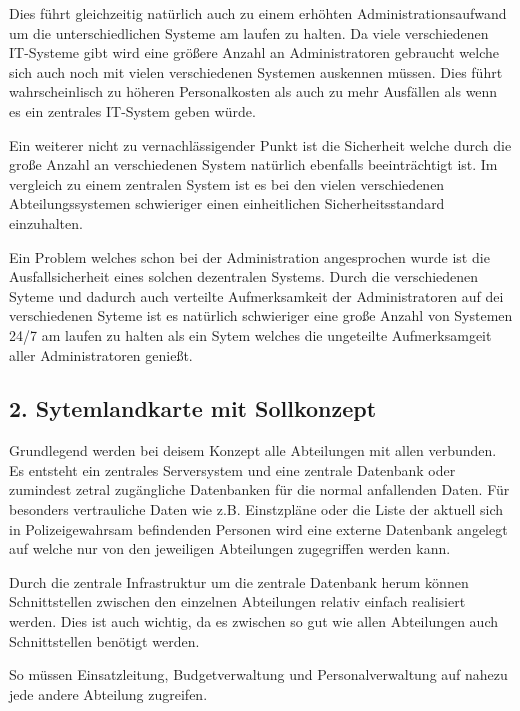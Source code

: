 \documentclass[12pt,utf8]{scrartcl}
\begin{document}
Dies führt gleichzeitig natürlich auch zu einem erhöhten Administrationsaufwand um die unterschiedlichen Systeme am laufen zu halten. Da viele verschiedenen IT-Systeme gibt wird eine größere Anzahl an Administratoren gebraucht welche sich auch noch  mit vielen verschiedenen Systemen auskennen müssen. Dies führt wahrscheinlisch zu höheren Personalkosten als auch zu mehr Ausfällen als wenn es ein zentrales IT-System geben würde.

Ein weiterer nicht zu vernachlässigender Punkt ist die Sicherheit welche durch die große Anzahl an verschiedenen System natürlich ebenfalls beeinträchtigt ist. Im vergleich zu einem zentralen System ist es bei den vielen verschiedenen Abteilungssystemen schwieriger einen einheitlichen Sicherheitsstandard einzuhalten.

Ein Problem welches schon bei der Administration angesprochen wurde ist die Ausfallsicherheit eines solchen dezentralen Systems. Durch die verschiedenen Syteme und dadurch auch verteilte Aufmerksamkeit der Administratoren auf dei verschiedenen Syteme ist es natürlich schwieriger eine große Anzahl von Systemen 24/7 am laufen zu halten als ein Sytem welches die ungeteilte Aufmerksamgeit aller Administratoren genießt.\cite{APariConsulting}


\subsection*{\label{sub:thema}2. Sytemlandkarte mit Sollkonzept}

Grundlegend werden bei deisem Konzept alle Abteilungen mit allen verbunden. Es entsteht ein zentrales Serversystem und eine zentrale Datenbank oder zumindest zetral zugängliche Datenbanken für die normal anfallenden Daten. Für besonders vertrauliche Daten wie z.B. Einstzpläne oder die Liste der aktuell sich in Polizeigewahrsam befindenden Personen wird eine externe Datenbank angelegt auf welche nur von den jeweiligen Abteilungen zugegriffen werden kann.

Durch die zentrale Infrastruktur um die zentrale Datenbank herum können Schnittstellen zwischen den einzelnen Abteilungen relativ einfach realisiert werden. Dies ist auch wichtig, da es zwischen so gut wie allen Abteilungen auch Schnittstellen benötigt werden. 

So müssen Einsatzleitung, Budgetverwaltung und Personalverwaltung auf nahezu jede andere Abteilung zugreifen.
\end{document}
